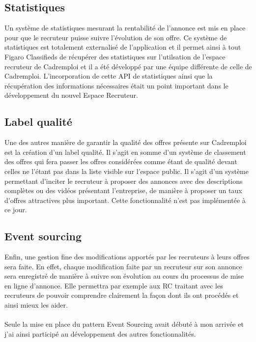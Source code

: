 \subsection{Statistiques}
\label{sub:Statistiques}
Un système de statistiques mesurant la rentabilité de l'annonce est mis en place pour que le recruteur puisse suivre l'évolution de son offre.
Ce système de statistiques est totalement externalisé de l'application et il permet ainsi à tout Figaro Classifieds de récupérer des statistiques sur l'utilsation de l'espace recruteur de Cadremploi et il a été développé par une équipe différente de celle de Cadremploi.
L'incorporation de cette API de statistiques ainsi que la récupération des informations nécessaires était un point important dans le développement du nouvel Espace Recruteur.

\subsection{Label qualité}
\label{sub:Label qualité}
Une des autres manière de garantir la qualité des offres présente sur Cadremploi est la création d'un label qualité.
Il s'agit en somme d'un système de classement des offres qui fera passer les offres considérées comme étant de qualité devant celles ne l'étant pas dans la liste visible sur l'espace public.
Il s'agit d'un système permettant d'inciter le recruteur à proposer des annonces avec des descriptions complètes ou des vidéos présentant l'entreprise, de manière à proposer un taux d'offres attractives plus important.
Cette fonctionnalité n'est pas implémentée à ce jour.

\subsection{Event sourcing}
\label{sub:Event sourcing}
Enfin, une gestion fine des modifications apportés par les recruteurs à leurs offres sera faite.
En effet, chaque modification faite par un recruteur sur son annonce sera enregistré de manière à suivre son évolution au cours du processus de mise en ligne d'annonce.
Elle permettra par exemple aux RC traitant avec les recruteurs de pouvoir comprendre clairement la façon dont ils ont procédés et ainsi mieux les aider.

\paragraph{}
Seule la mise en place du pattern Event Sourcing avait débuté à mon arrivée et j'ai ainsi participé au développement des autres fonctionnalités.
